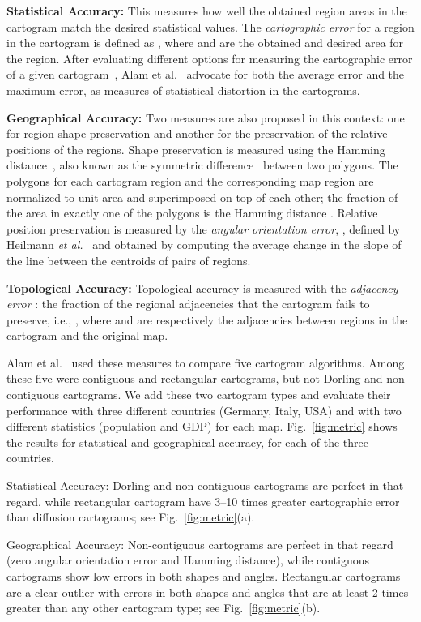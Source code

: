 \documentclass[10pt,journal,compsoc]{IEEEtran}
\begin{document}
\textbf{Statistical Accuracy:}
This measures how well the obtained region areas in the cartogram match the desired statistical values. 
The \textit{cartographic error} for a region  in the cartogram is defined as , where  and  are the obtained and desired area for the region. After evaluating different options for measuring the cartographic error of a given cartogram~\cite{KNPS03,KNP04,BSV12}, Alam et al.~\cite{AKV15} advocate for both the average error and the maximum error, as measures of statistical distortion in the cartograms.

\label{stat}
\textbf{Geographical Accuracy: } 
Two measures are also proposed in this context: one for region shape preservation and another for the preservation of the relative positions of the regions. 
Shape preservation is measured using the Hamming distance~\cite{SKI98}, also known as the symmetric difference~\cite{MRS10} between two polygons. The polygons for each cartogram region and the corresponding map region are normalized to unit area and superimposed on top of each other; the fraction of the area in exactly one of the polygons is the Hamming distance . Relative position preservation is measured by the \textit{angular orientation error}, , defined by Heilmann \textit{et al.}~\cite{hkps04} and obtained by computing the average change in the slope of the line between the centroids of pairs of regions.

\textbf{Topological Accuracy:} 
Topological accuracy is measured with the \textit{adjacency error} : the fraction of the regional adjacencies that the cartogram fails to preserve, i.e., , where  and  are respectively the adjacencies between regions in the cartogram and the original map.
\medskip

Alam et al.~\cite{AKV15} used these measures to compare five cartogram algorithms.
Among these five were contiguous and rectangular cartograms, but not Dorling and non-contiguous cartograms. We add these two cartogram types and evaluate their performance with three different countries (Germany, Italy, USA) and with two different statistics (population and GDP) for each map. Fig.~\ref{fig:metric} shows the results for statistical and geographical accuracy, for each of the three countries. 


Statistical Accuracy: Dorling and non-contiguous cartograms are perfect in that regard, while rectangular cartogram have 3--10 times greater cartographic error than diffusion cartograms; see Fig.~\ref{fig:metric}(a).

Geographical Accuracy: Non-contiguous cartograms are perfect in that regard (zero angular orientation error and Hamming distance), while contiguous cartograms show low errors in both shapes and angles. Rectangular cartograms are a clear outlier with errors in both shapes and angles that are at least 2 times greater than any other cartogram type; see Fig.~\ref{fig:metric}(b).
\end{document}
